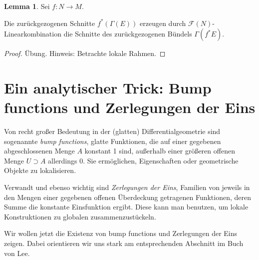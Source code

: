 \documentclass[a4paper]{scrreprt}
\numberwithin{equation}{chapter}
\newcommand{\sm}{\mathcal{F}}
\theoremstyle{definition}
\newtheorem{lemma}[defn]{Lemma}
\begin{document}
		\begin{lemma}\label{lemma:Zurückziehen_von_Schnitten}
			Sei $f:N\rightarrow M$.
			
			Die zurückgezogenen Schnitte $f^*(\Gamma(E))$ erzeugen durch $\sm(N)$-Linearkombination die Schnitte des zurückgezogenen Bündels $\Gamma(f^*E)$.
			\begin{proof}
				Übung. Hinweis: Betrachte lokale Rahmen.
			\end{proof}
		\end{lemma}


\chapter{Ein analytischer Trick: Bump functions und Zerlegungen der Eins}

Von recht großer Bedeutung in der (glatten) Differentialgeometrie sind sogenannte \emph{bump functions}, glatte Funktionen, die auf einer gegebenen abgeschlossenen Menge $A$ konstant 1 sind, außerhalb einer größeren offenen Menge $U \supset A$ allerdings 0. Sie ermöglichen, Eigenschaften oder geometrische Objekte zu \glqq lokalisieren\grqq.

Verwandt und ebenso wichtig sind \emph{Zerlegungen der Eins}, Familien von jeweils in den Mengen einer gegebenen offenen Überdeckung getragenen Funktionen, deren Summe die konstante Einsfunktion ergibt. Diese kann man benutzen, um lokale Konstruktionen zu globalen \glqq zusammenzustückeln\grqq.

Wir wollen jetzt die Existenz von bump functions und Zerlegungen der Eins zeigen. Dabei orientieren wir uns stark am entsprechenden Abschnitt im Buch von Lee.

\end{document}
